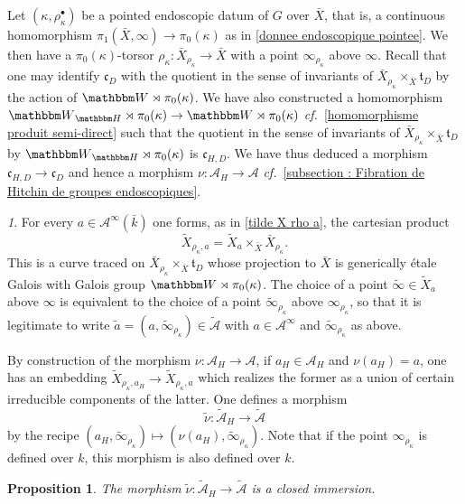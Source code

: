 \documentclass[12pt,english]{smfart}
\numberwithin{equation}{subsection}
\newtheorem{proposition}[equation]{Proposition}
\theoremstyle{remark}
\newtheorem{numero}[equation]{}
\newcommand\calA{{\mathscr A}}
\newcommand\frakt{{\mathfrak t}}
\newcommand\frakc{{\mathfrak c}}
\newcommand\HH{{\mathbbm H}}
\newcommand\bbW{{\mathbbm W}}
\newcommand\cf{{\it cf.\ }}
\begin{document}
Let $(\kappa,\rho_\kappa^\bullet)$ be a pointed endoscopic datum of $G$ over $\bar X$, that is, a continuous homomorphism $\pi_1(\bar X,\infty)\rightarrow\pi_0(\kappa)$ as in \ref{donnee endoscopique pointee}. We then have a $\pi_0(\kappa)$-torsor $\rho_\kappa:\bar X_{\rho_\kappa}\rightarrow\bar X$ with a point $\infty_{\rho_\kappa}$ above $\infty$. Recall that one may identify $\frakc_D$ with the quotient in the sense of invariants of $\bar X_{\rho_\kappa}\times_{\bar X}\frakt_D$ by the action of $\bbW\rtimes\pi_0(\kappa)$. We have also constructed a homomorphism $\bbW_\HH\rtimes\pi_0(\kappa)\rightarrow\bbW\rtimes\pi_0(\kappa)$ \cf \ref{homomorphisme produit semi-direct} such that the quotient in the sense of invariants of $\bar X_{\rho_\kappa}\times_{\bar X}\frakt_D$ by $\bbW_\HH\rtimes\pi_0(\kappa)$ is $\frakc_{H,D}$. We have thus deduced a morphism $\frakc_{H,D}\rightarrow\frakc_D$ and hence a morphism $\nu:\calA_H\rightarrow\calA$ \cf \ref{subsection : Fibration de Hitchin de groupes endoscopiques}.

\begin{numero}\label{immense diagramme}
For every $a\in\calA^\infty(\bar k)$ one forms, as in \ref{tilde X rho a}, the cartesian product
$$\widetilde X_{\rho_\kappa,a}=\widetilde X_a\times_{\bar X}\bar X_{\rho_\kappa}.$$
This is a curve traced on $\bar X_{\rho_\kappa}\times_{\bar X}\frakt_D$ whose projection to $\bar X$ is generically \'etale Galois with Galois group $\bbW\rtimes\pi_0(\kappa)$. The choice of a point $\tilde\infty\in\widetilde X_a$ above $\infty$ is equivalent to the choice of a point $\tilde\infty_{\rho_\kappa}$ above $\infty_{\rho_\kappa}$, so that it is legitimate to write $\tilde a=(a,\tilde\infty_{\rho_\kappa})\in\tilde\calA$ with $a\in\calA^\infty$ and $\tilde\infty_{\rho_\kappa}$ as above.

By construction of the morphism $\nu:\calA_H\rightarrow\calA$, if $a_H\in\calA_H$ and $\nu(a_H)=a$, one has an embedding $\widetilde X_{\rho_\kappa,a_H}\rightarrow\widetilde X_{\rho_\kappa,a}$ which realizes the former as a union of certain irreducible components of the latter. One defines a morphism
$$\tilde\nu:\tilde\calA_H\rightarrow\tilde\calA$$
by the recipe $(a_H,\tilde\infty_{\rho_\kappa})\mapsto(\nu(a_H),\tilde\infty_{\rho_\kappa})$. Note that if the point $\infty_{\rho_\kappa}$ is defined over $k$, this morphism is also defined over $k$.
\end{numero}

\begin{proposition}\label{immersion fermee}
The morphism $\tilde\nu:\tilde\calA_H\rightarrow\tilde\calA$ is a closed immersion.
\end{proposition}
\end{document}
